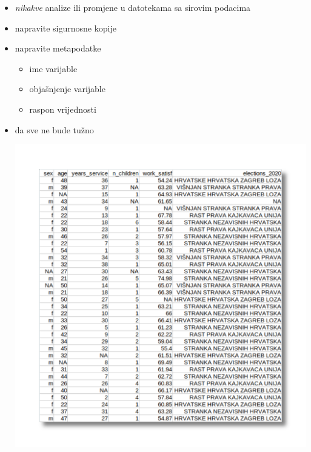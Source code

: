 \documentclass[handout,aspectratio=169]{beamer}
\begin{document}
\begin{frame}
    \begin{itemize}
        \setlength{\itemsep}{2em}

        \item \textit{nikakve} analize ili promjene u datotekama sa sirovim
            podacima

        \pause

        \item napravite sigurnosne kopije

        \pause

        \item napravite metapodatke

        \begin{itemize}
            \item ime varijable

            \item objašnjenje varijable

            \item raspon vrijednosti

        \end{itemize}

    \end{itemize}
\end{frame}

\begin{frame}
    \begin{itemize}
        \item da sve ne bude tužno

        \begin{center}
            \includegraphics[scale=.30]{images/nice-but-fake.png}
        \end{center}

    \end{itemize}
\end{frame}
\end{document}
